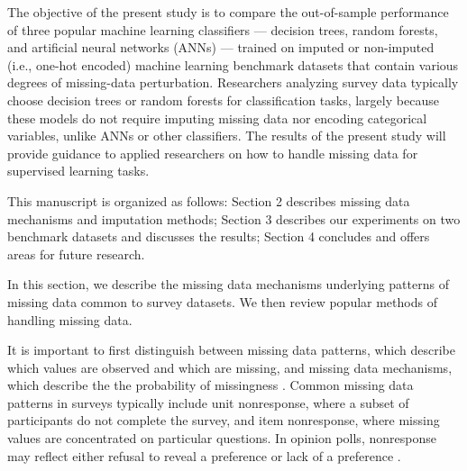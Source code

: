 \documentclass[10pt]{book}
\theoremstyle{definition}
\begin{document}
The objective of the present study is to compare the out-of-sample performance of three popular machine learning classifiers --- decision trees, random forests, and artificial neural networks (ANNs) --- trained on imputed or non-imputed (i.e., one-hot encoded) machine learning benchmark datasets that contain various degrees of missing-data perturbation. Researchers analyzing survey data typically choose decision trees or random forests for classification tasks, largely because these models do not require imputing missing data nor encoding categorical variables, unlike ANNs or other classifiers. The results of the present study will provide guidance to applied researchers on how to handle missing data for supervised learning tasks. 

This manuscript is organized as follows: Section 2 describes missing data mechanisms and imputation methods; Section 3 describes our experiments on two benchmark datasets and discusses the results; Section 4 concludes and offers areas for future research. 

\par

\lhead[\footnotesize\thepage\fancyplain{}\leftmark]{}\rhead[]{\fancyplain{}\rightmark\footnotesize\thepage}%

\setcounter{chapter}{2}
\setcounter{equation}{0} %

In this section, we describe the missing data mechanisms underlying patterns of missing data common to survey datasets. We then review popular methods of handling missing data.

\par
{}

It is important to first distinguish between missing data patterns, which describe which values are observed and which are missing, and missing data mechanisms, which describe the the probability of missingness  \citep[Chap.~1]{little2014}. Common missing data patterns in surveys typically include unit nonresponse, where a subset of participants do not complete the survey, and item nonresponse, where missing values are concentrated on particular questions. In opinion polls, nonresponse may reflect either refusal to reveal a preference or lack of a preference \citep{de2003prevention}. 
\end{document}
